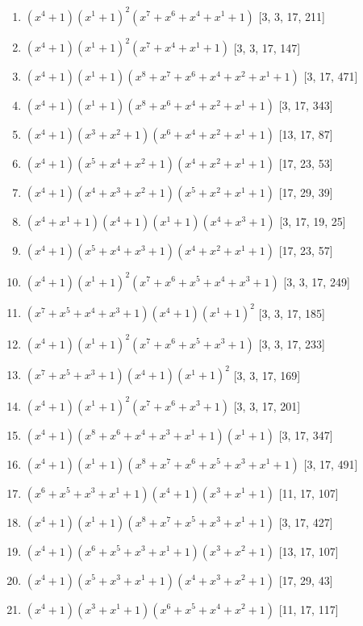 \documentclass[10pt,twocolumn]{article}
\begin{document}
\begin{enumerate}
\item $(x^{4} + 1)(x^{1} + 1)^{2}(x^{7} + x^{6} + x^{4} + x^{1} + 1)$  [3, 3, 17, 211]
\item $(x^{4} + 1)(x^{1} + 1)^{2}(x^{7} + x^{4} + x^{1} + 1)$  [3, 3, 17, 147]
\item $(x^{4} + 1)(x^{1} + 1)(x^{8} + x^{7} + x^{6} + x^{4} + x^{2} + x^{1} + 1)$  [3, 17, 471]
\item $(x^{4} + 1)(x^{1} + 1)(x^{8} + x^{6} + x^{4} + x^{2} + x^{1} + 1)$  [3, 17, 343]
\item $(x^{4} + 1)(x^{3} + x^{2} + 1)(x^{6} + x^{4} + x^{2} + x^{1} + 1)$  [13, 17, 87]
\item $(x^{4} + 1)(x^{5} + x^{4} + x^{2} + 1)(x^{4} + x^{2} + x^{1} + 1)$  [17, 23, 53]
\item $(x^{4} + 1)(x^{4} + x^{3} + x^{2} + 1)(x^{5} + x^{2} + x^{1} + 1)$  [17, 29, 39]
\item $(x^{4} + x^{1} + 1)(x^{4} + 1)(x^{1} + 1)(x^{4} + x^{3} + 1)$  [3, 17, 19, 25]
\item $(x^{4} + 1)(x^{5} + x^{4} + x^{3} + 1)(x^{4} + x^{2} + x^{1} + 1)$  [17, 23, 57]
\item $(x^{4} + 1)(x^{1} + 1)^{2}(x^{7} + x^{6} + x^{5} + x^{4} + x^{3} + 1)$  [3, 3, 17, 249]
\item $(x^{7} + x^{5} + x^{4} + x^{3} + 1)(x^{4} + 1)(x^{1} + 1)^{2}$  [3, 3, 17, 185]
\item $(x^{4} + 1)(x^{1} + 1)^{2}(x^{7} + x^{6} + x^{5} + x^{3} + 1)$  [3, 3, 17, 233]
\item $(x^{7} + x^{5} + x^{3} + 1)(x^{4} + 1)(x^{1} + 1)^{2}$  [3, 3, 17, 169]
\item $(x^{4} + 1)(x^{1} + 1)^{2}(x^{7} + x^{6} + x^{3} + 1)$  [3, 3, 17, 201]
\item $(x^{4} + 1)(x^{8} + x^{6} + x^{4} + x^{3} + x^{1} + 1)(x^{1} + 1)$  [3, 17, 347]
\item $(x^{4} + 1)(x^{1} + 1)(x^{8} + x^{7} + x^{6} + x^{5} + x^{3} + x^{1} + 1)$  [3, 17, 491]
\item $(x^{6} + x^{5} + x^{3} + x^{1} + 1)(x^{4} + 1)(x^{3} + x^{1} + 1)$  [11, 17, 107]
\item $(x^{4} + 1)(x^{1} + 1)(x^{8} + x^{7} + x^{5} + x^{3} + x^{1} + 1)$  [3, 17, 427]
\item $(x^{4} + 1)(x^{6} + x^{5} + x^{3} + x^{1} + 1)(x^{3} + x^{2} + 1)$  [13, 17, 107]
\item $(x^{4} + 1)(x^{5} + x^{3} + x^{1} + 1)(x^{4} + x^{3} + x^{2} + 1)$  [17, 29, 43]
\item $(x^{4} + 1)(x^{3} + x^{1} + 1)(x^{6} + x^{5} + x^{4} + x^{2} + 1)$  [11, 17, 117]

\end{enumerate}
\end{document}

